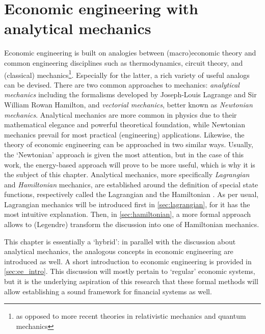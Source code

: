 \chapter{Economic engineering with analytical mechanics}
\label{chap:ee}
Economic engineering is built on analogies between (macro)economic theory and common engineering disciplines such as thermodynamics, circuit theory, and (classical) mechanics\footnote{as opposed to more recent theories in relativistic mechanics and quantum mechanics}. Especially for the latter, a rich variety of useful analogs can be devised. There are two common approaches to mechanics: \emph{analytical mechanics} including the formalisms developed by Joseph-Louis Lagrange and Sir William Rowan Hamilton, and \emph{vectorial mechanics}, better known as \emph{Newtonian mechanics}. Analytical mechanics are more common in physics due to their mathematical elegance and powerful theoretical foundation, while Newtonian mechanics prevail for most practical (engineering) applications. Likewise, the theory of economic engineering can be approached in two similar ways. Usually, the `Newtonian' approach is given the most attention, but in the case of this work, the energy-based approach will prove to be more useful, which is why it is the subject of this chapter. 
Analytical mechanics, more specifically \emph{Lagrangian} and \emph{Hamiltonian} mechanics, are established around the definition of special state functions, respectively called the Lagrangian  and the Hamiltonian . As per usual, Lagrangian mechanics will be introduced first in \cref{sec:lagrangian}, for it has the most intuitive explanation. Then, in \cref{sec:hamiltonian}, a more formal approach allows to (Legendre) transform the discussion into one of Hamiltonian mechanics. 

This chapter is essentially a `hybrid': in parallel with the discussion about analytical mechanics, the analogous concepts in economic engineering are introduced as well. A short introduction to economic engineering is provided in \cref{sec:ee_intro}. This discussion will mostly pertain to `regular' economic systems, but it is the underlying aspiration of this research that these formal methods will allow establishing a sound framework for financial systems as well.

